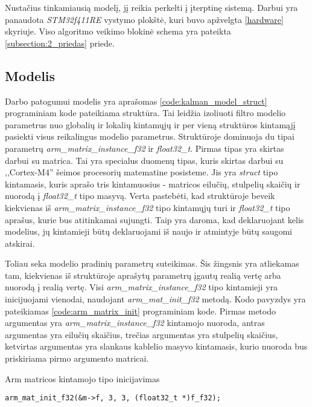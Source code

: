 Nustačius tinkamiausią modelį, jį reikia perkelti į įterptinę sistemą.
Darbui yra panaudota \textit{STM32f411RE} vystymo plokštė, kuri buvo apžvelgta \ref{hardware} skyriuje.
Viso algoritmo veikimo blokinė schema yra pateikta \ref{subsection:2_priedas} priede.

\subsection{Modelis}

Darbo patogumui modelis yra aprašomas \ref{code:kalman_model_struct} programiniam kode pateikiama struktūra. 
Tai leidžia izoliuoti filtro modelio parametrus nuo globalių ir lokalių kintamųjų ir per vieną struktūros kintamąjį pasiekti visus reikalingus modelio parametrus.
Struktūroje dominuoja du tipai parametrų \textit{arm\_matrix\_instance\_f32} ir \textit{float32\_t}.
Pirmas tipas yra skirtas darbui su matrica.
Tai yra specialus duomenų tipas, kuris skirtas darbui su ,,Cortex-M4'' šeimos procesorių matematine posisteme.
Jis yra \textit{struct} tipo kintamasis, kuris aprašo tris kintamuosius - matricos eilučių, stulpelių skaičių ir nuorodą į \textit{float32\_t} tipo masyvą.
Verta pastebėti, kad struktūroje beveik kiekvienas iš \textit{arm\_matrix\_instance\_f32} tipo kintamųjų turi ir \textit{float32\_t} tipo aprašus, kurie bus atitinkamai sujungti.
Taip yra daroma, kad deklaruojant kelis modelius, jų kintamieji būtų deklaruojami iš naujo ir atmintyje būtų saugomi atskirai.

Toliau seka modelio pradinių parametrų suteikimas.
Šis žingsnis yra atliekamas tam, kiekvienas iš struktūroje aprašytų parametrų įgautų realią vertę arba nuorodą į realią vertę.
Visi \textit{arm\_matrix\_instance\_f32} tipo kintamieji yra inicijuojami vienodai, naudojant \textit{arm\_mat\_init\_f32} metodą.
Kodo pavyzdys yra pateikiamas \ref{code:arm_matrix_init} programiniam kode.
Pirmas metodo argumentas yra \textit{arm\_matrix\_instance\_f32} kintamojo nuoroda, antras argumentas yra eilučių skaičius, trečias argumentas yra stulpelių skaičius, ketvirtas argumentas yra slankaus kablelio masyvo kintamasis, kurio nuoroda bus priskiriama pirmo argumento matricai.

\begin{cfigure}[b]
    \centering
    \caption{Arm matricos kintamojo tipo inicijavimas}
    \label{code:arm_matrix_init}
    \begin{lstlisting}
arm_mat_init_f32(&m->f, 3, 3, (float32_t *)f_f32);
    \end{lstlisting}
\end{cfigure}

